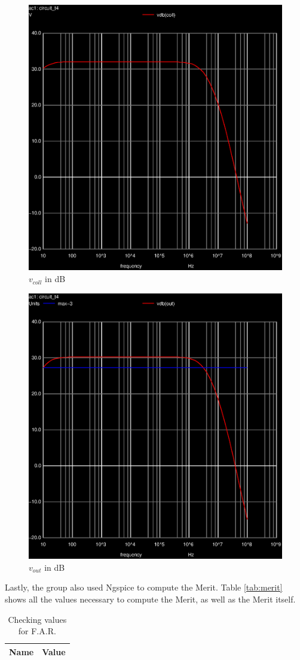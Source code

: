 \begin{figure}[ht]
	\centering
	\includegraphics[width=0.6\linewidth]{vo1f.eps}
	\caption{$v_{coll}$ in dB}
\label{fig:EV_vout}
\end{figure}

\begin{figure}[ht]
	\centering
	\includegraphics[width=0.6\linewidth]{vo2f.eps}
	\caption{$v_{out}$ in dB}
\label{fig:VR_vout}
\end{figure}



Lastly, the group also used Ngspice to compute the Merit. Table \ref{tab:merit} shows all the 
values necessary to compute the Merit, as well as the Merit itself.

\begin{table}[ht]
	\centering
	\begin{tabular}{|l|r|}
		\hline    
		{\bf Name} & {\bf Value} \\ \hline
    		
	\end{tabular}
	
	\caption{Checking values for F.A.R.}
    
\label{tab:op_sim}
\end{table}

